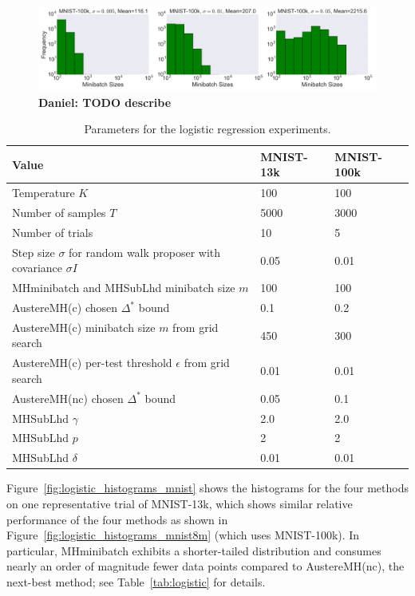 \documentclass[letterpaper]{article}
\newcommand\T{\rule{0pt}{2.6ex}}       %
\begin{document}
\begin{figure}[t]
	\centering
    \includegraphics[width=0.9\linewidth]{logistic_regression_step_size_tests.png}
	\caption{
    \textbf{Daniel: TODO describe}
    }
	\label{fig:logistic_histograms_appendix}
\end{figure}

\begin{table}[t]
\caption{Parameters for the logistic regression experiments.}
\small
\label{tab:logistic_settings}
\vskip 0.15in
\begin{center}
\begin{tabular}{l l l}
\textbf{Value} & \textbf{MNIST-13k} & \textbf{MNIST-100k} \\
\hline
\T Temperature $K$       & 100 & 100 \\
Number of samples $T$ & 5000 & 3000 \\
Number of trials      & 10 & 5 \\
Step size $\sigma$ for random walk proposer with covariance $\sigma I$ & 0.05 & 0.01 \\
{\sc MHminibatch} and {\sc MHSubLhd} minibatch size $m$ & 100 & 100 \\
{\sc AustereMH(c)} chosen $\Delta^*$ bound & 0.1 & 0.2 \\
{\sc AustereMH(c)} minibatch size $m$ from grid search & 450 & 300 \\
{\sc AustereMH(c)} per-test threshold $\epsilon$ from grid search & 0.01 & 0.01\\
{\sc AustereMH(nc)} chosen $\Delta^*$ bound & 0.05 & 0.1 \\
{\sc MHSubLhd} $\gamma$ & 2.0  & 2.0  \\
{\sc MHSubLhd} $p$      & 2 & 2 \\
{\sc MHSubLhd} $\delta$ & 0.01 & 0.01 \\
\end{tabular}
\end{center}
\vskip -0.1in
\end{table}

Figure~\ref{fig:logistic_histograms_mnist} shows the histograms for the four
methods on one representative trial of MNIST-13k, which shows similar relative
performance of the four methods as shown in
Figure~\ref{fig:logistic_histograms_mnist8m} (which uses MNIST-100k). In
particular, {\sc MHminibatch} exhibits a shorter-tailed distribution and
consumes nearly an order of magnitude fewer data points compared to {\sc
AustereMH(nc)}, the next-best method; see Table~\ref{tab:logistic} for details.
\end{document}
